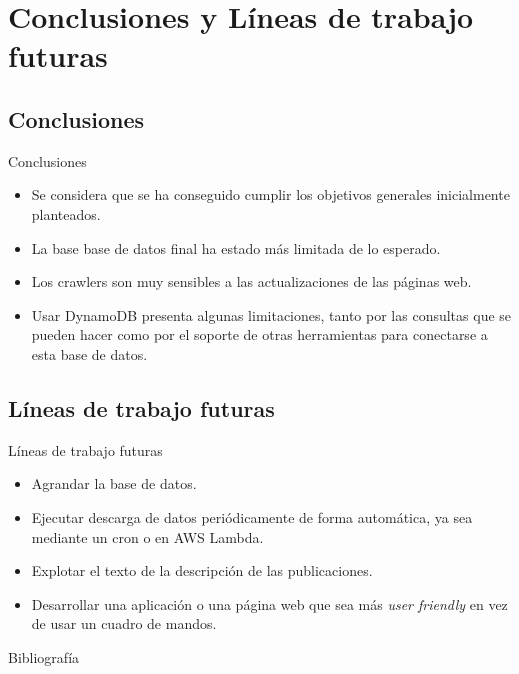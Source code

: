 \documentclass[aspectratio=149]{beamer}
\begin{document}
\section{Conclusiones y Líneas de trabajo futuras}

\subsection{Conclusiones}
\begin{frame}[label=conclu]{Conclusiones}
    \begin{itemize}
        \item Se considera que se ha conseguido cumplir los objetivos generales inicialmente planteados.
        \item La base base de datos final ha estado más limitada de lo esperado.
        \item Los crawlers son muy sensibles a las actualizaciones de las páginas web.
        \item Usar DynamoDB presenta algunas limitaciones, tanto por las consultas que se pueden hacer como por el soporte de otras herramientas para conectarse a esta base de datos.
    \end{itemize}
\end{frame}

\subsection{Líneas de trabajo futuras}
\begin{frame}[label=lineas]{Líneas de trabajo futuras}
    \begin{itemize}
        \item Agrandar la base de datos.
        \item Ejecutar descarga de datos periódicamente de forma automática, ya sea mediante un cron o en AWS Lambda.
        \item Explotar el texto de la descripción de las publicaciones.
        \item Desarrollar una aplicación o una página web que sea más \textit{user friendly} en vez de usar un cuadro de mandos.
    \end{itemize}
\end{frame}

\begin{frame}{Bibliografía}
    \printbibliography
\end{frame}
\end{document}
